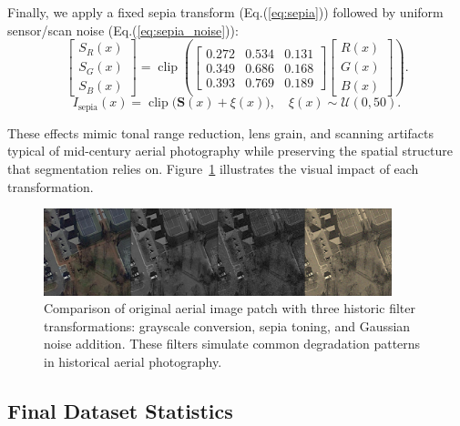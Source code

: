 \documentclass[journal]{IEEEtran}
\newcommand{\eqnref}[1]{Eq.(\ref{#1})}
\begin{document}
Finally, we apply a fixed sepia transform (\eqnref{eq:sepia}) followed by uniform sensor/scan noise (\eqnref{eq:sepia_noise}):
\begin{equation}
\begin{bmatrix} S_R(x) \\ S_G(x) \\ S_B(x) \end{bmatrix}
= \operatorname{clip}\left(
\begin{bmatrix}
0.272 & 0.534 & 0.131 \\
0.349 & 0.686 & 0.168 \\
0.393 & 0.769 & 0.189
\end{bmatrix}
\begin{bmatrix} R(x) \\ G(x) \\ B(x) \end{bmatrix}
\right).
\label{eq:sepia}
\end{equation}
\begin{equation}
I_{\text{sepia}}(x) = \operatorname{clip}\big(\mathbf{S}(x) + \xi(x)\big),\quad \xi(x)\sim\mathcal{U}(0,50).
\label{eq:sepia_noise}
\end{equation}

These effects mimic tonal range reduction, lens grain, and scanning artifacts typical of mid-century aerial photography while preserving the spatial structure that segmentation relies on. Figure~\ref{fig:historic_filters} illustrates the visual impact of each transformation.

\begin{figure}[t]
\centering
\includegraphics[width=0.9\textwidth]{./images/filters.png}
\caption{Comparison of original aerial image patch with three historic filter transformations: grayscale conversion, sepia toning, and Gaussian noise addition. These filters simulate common degradation patterns in historical aerial photography.}
\label{fig:historic_filters}
\end{figure}

\subsection{Final Dataset Statistics}
\end{document}
